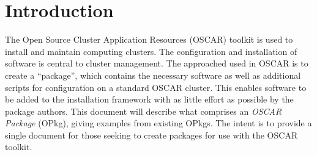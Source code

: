 
\section{Introduction}
\label{sect:intro}

The Open Source Cluster Application Resources (OSCAR) toolkit is used to
install and maintain computing clusters.  The configuration and
installation of software is central to cluster management.  The approached
used in OSCAR is to create a ``package'', which contains the necessary
software as well as additional scripts for configuration on a standard
OSCAR cluster.  This enables software to be added to the installation
framework with as little effort as possible by the package authors.  This
document will describe what comprises an \emph{OSCAR Package} (OPkg),
giving examples from existing OPkgs.  The intent is to provide a single
document for those seeking to create packages for use with the OSCAR
toolkit.


